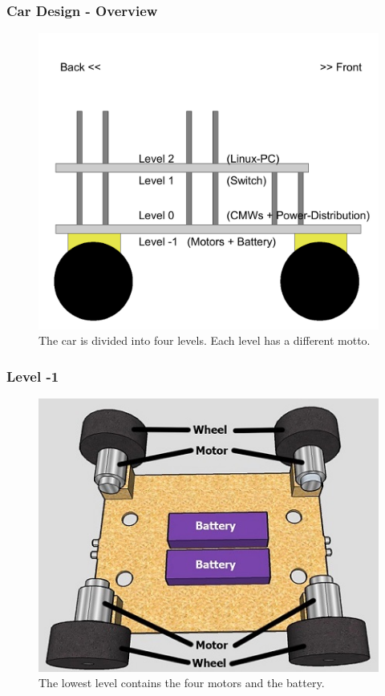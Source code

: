\documentclass{beamer}
\begin{document}
\begin{frame}
	\frametitle{Car Design - Overview}
	\begin{figure}
	\includegraphics[scale=0.4]{figures/overview.pdf}
	\caption{The car is divided into four levels. Each level has a different motto.}
	\end{figure}
\end{frame}

\begin{frame}
	\frametitle{Level -1}
	\begin{figure}
	\includegraphics[scale=0.7]{figures/level-1_b.jpg}
	\caption{The lowest level contains the four motors and the battery.}
	\end{figure}
	
\end{frame}
\end{document}

